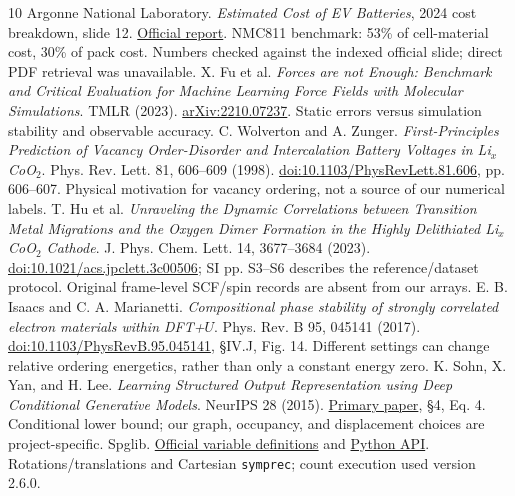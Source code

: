 \begin{thebibliography}{10}\setlength{\itemsep}{3pt}\setlength{\parskip}{0pt}
 Argonne National Laboratory. \emph{Estimated Cost of EV Batteries}, 2024 cost breakdown, slide 12. \href{https://www.anl.gov/sites/www/files/2024-11/GPRA2024_06Nov2024.pdf}{Official report}. NMC811 benchmark: 53\% of cell-material cost, 30\% of pack cost. Numbers checked against the indexed official slide; direct PDF retrieval was unavailable.
 X. Fu et al. \emph{Forces are not Enough: Benchmark and Critical Evaluation for Machine Learning Force Fields with Molecular Simulations}. TMLR (2023). \href{https://arxiv.org/abs/2210.07237}{arXiv:2210.07237}. Static errors versus simulation stability and observable accuracy.
 C. Wolverton and A. Zunger. \emph{First-Principles Prediction of Vacancy Order-Disorder and Intercalation Battery Voltages in Li$_x$CoO$_2$}. Phys. Rev. Lett. 81, 606--609 (1998). \href{https://doi.org/10.1103/PhysRevLett.81.606}{doi:10.1103/PhysRevLett.81.606}, pp. 606--607. Physical motivation for vacancy ordering, not a source of our numerical labels.
 T. Hu et al. \emph{Unraveling the Dynamic Correlations between Transition Metal Migrations and the Oxygen Dimer Formation in the Highly Delithiated Li$_x$CoO$_2$ Cathode}. J. Phys. Chem. Lett. 14, 3677--3684 (2023). \href{https://doi.org/10.1021/acs.jpclett.3c00506}{doi:10.1021/acs.jpclett.3c00506}; SI pp. S3--S6 describes the reference/dataset protocol. Original frame-level SCF/spin records are absent from our arrays.
 E. B. Isaacs and C. A. Marianetti. \emph{Compositional phase stability of strongly correlated electron materials within DFT+$U$}. Phys. Rev. B 95, 045141 (2017). \href{https://doi.org/10.1103/PhysRevB.95.045141}{doi:10.1103/PhysRevB.95.045141}, \S IV.J, Fig. 14. Different settings can change relative ordering energetics, rather than only a constant energy zero.
 K. Sohn, X. Yan, and H. Lee. \emph{Learning Structured Output Representation using Deep Conditional Generative Models}. NeurIPS 28 (2015). \href{https://proceedings.neurips.cc/paper_files/paper/2015/file/8d55a249e6baa5c06772297520da2051-Paper.pdf}{Primary paper}, \S4, Eq. 4. Conditional lower bound; our graph, occupancy, and displacement choices are project-specific.
 Spglib. \href{https://spglib.readthedocs.io/en/stable/variable.html}{Official variable definitions} and \href{https://spglib.readthedocs.io/en/v2.6.0/api/python-api.html}{Python API}. Rotations/translations and Cartesian \texttt{symprec}; count execution used version 2.6.0.

\end{thebibliography}
